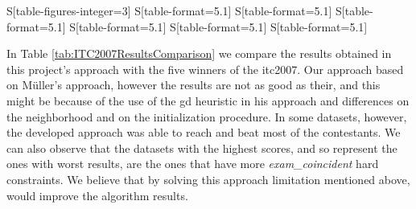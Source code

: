 \begin{table*}[!t]
\begin{tabular}{%
	S[table-figures-integer=3]%
	S[table-format=5.1]%
	S[table-format=5.1]%
	S[table-format=5.1]%
	S[table-format=5.1]%
	S[table-format=5.1]%
	S[table-format=5.1]%
    }
\bottomrule

\end{tabular}
\label{tab:20tests}
\end{table*}In Table \ref{tab:ITC2007ResultsComparison} we compare the results obtained in this project's approach with the five winners of the \gls{itc2007}. Our approach based on M\"{u}ller's \cite{Mueller2009} approach, however the results are not as good as their, and this might be because of the use of the \gls{gd} heuristic in his approach and differences on the neighborhood and on the initialization procedure. In some datasets, however, the developed approach was able to reach and beat most of the contestants. We can also observe that the datasets with the highest scores, and so represent the ones with worst results, are the ones that have more \textit{exam\_coincident} hard constraints. We believe that by solving this approach limitation mentioned above, would improve the algorithm results.\\
\\
